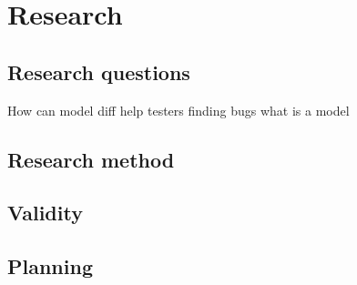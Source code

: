 \section{Research}

\subsection{Research questions}

How can model diff help testers finding bugs
what is a model

\subsection{Research method}

\subsection{Validity}

\subsection{Planning}